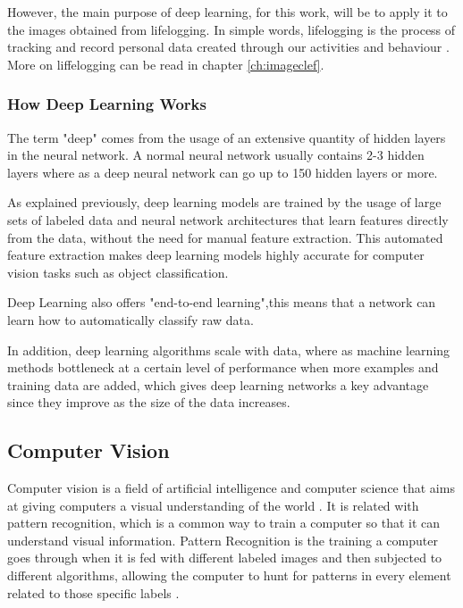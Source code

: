     \par However, the main purpose of deep learning, for this work, will be to apply it to the images obtained from lifelogging. In simple words, lifelogging is the process of tracking and record personal data created through our activities and behaviour \cite{Ribeiro}. More on liffelogging can be read in chapter \ref{ch:imageclef}.
    
    
    
        \subsubsection{How Deep Learning Works}
        
        \par The term "deep" comes from the usage of an extensive quantity of hidden layers in the neural network. A normal neural network usually contains 2-3 hidden layers where as a deep neural network can go up to 150 hidden layers or more.

        \par As explained previously, deep learning models are trained by the usage of  large sets of labeled data and neural network architectures that learn features directly from the data, without the need for manual feature extraction. This automated feature extraction makes deep learning models highly accurate for computer vision tasks such as object classification. 
        
        \par Deep Learning also offers "end-to-end learning",this means that a network can learn how to automatically classify raw data.

        \par In addition, deep learning algorithms scale with data, where as machine learning methods bottleneck at a certain level of performance when more examples and training data are added, which gives deep learning networks a key advantage since they improve as the size of the data increases. \cite{mathworks_deeplearning}



    \subsection{Computer Vision}
    \par Computer vision is a field of artificial intelligence and computer science that aims at giving computers a visual understanding of the world \cite{cv} \cite{cv2}. It is related with pattern recognition, which is a common way to train a computer so that it can understand visual information. Pattern Recognition is the training a computer goes through when it is fed with different labeled images and then subjected to different algorithms, allowing the computer to hunt for patterns in every element related to those specific labels \cite{pattern}.

